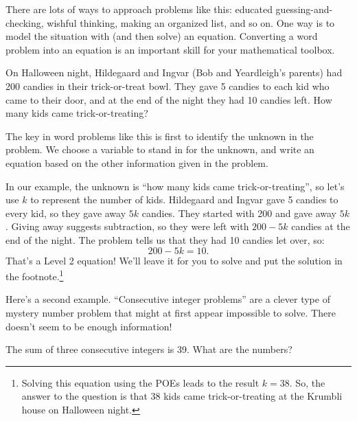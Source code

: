 There are lots of ways to approach problems like this: educated guessing-and-checking, wishful thinking, making an organized list, and so on. One way is to model the situation with (and then solve) an equation. Converting a word problem into an equation is an important skill for your mathematical toolbox.

\begin{boxedexplore}
\end{boxedexplore}

\begin{boxedexplore}
On Halloween night, Hildegaard and Ingvar (Bob and Yeardleigh's parents) had 200 candies in their trick-or-treat bowl. They gave 5 candies to each kid who came to their door, and at the end of the night they had 10 candies left. How many kids came trick-or-treating?
\end{boxedexplore}

The key in word problems like this is first to identify the unknown in the problem. We choose a variable to stand in for the unknown, and write an equation based on the other information given in the problem.

In our example, the unknown is ``how many kids came trick-or-treating'', so let's use $k$ to represent the number of kids. Hildegaard and Ingvar gave 5 candies to every kid, so they gave away $5k$ candies. They started with 200 and gave away $5k$. Giving away suggests subtraction, so they were left with $200-5k$ candies at the end of the night. The problem tells us that they had 10 candies let over, so:
\[200-5k = 10.\]
That's a Level 2 equation! We'll leave it for you to solve and put the solution in the footnote.\footnote{Solving this equation using the POEs leads to the result $k=38$. So, the answer to the question is that 38 kids came trick-or-treating at the Krumbli house on Halloween night.}

Here's a second example. ``Consecutive integer problems'' are a clever type of mystery number problem that might at first appear impossible to solve. There doesn't seem to be enough information!

\begin{boxedexplore}
The sum of three consecutive integers is 39. What are the numbers?
\end{boxedexplore} %

